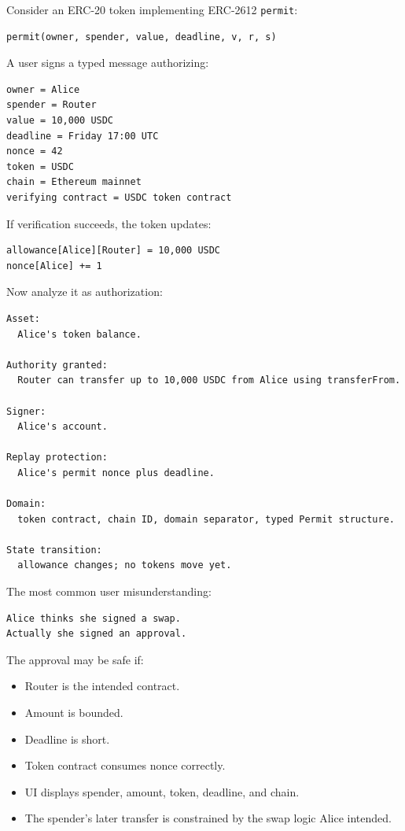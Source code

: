 Consider an ERC-20 token implementing ERC-2612
\passthrough{\lstinline!permit!}:

\begin{lstlisting}
permit(owner, spender, value, deadline, v, r, s)
\end{lstlisting}

A user signs a typed message authorizing:

\begin{lstlisting}
owner = Alice
spender = Router
value = 10,000 USDC
deadline = Friday 17:00 UTC
nonce = 42
token = USDC
chain = Ethereum mainnet
verifying contract = USDC token contract
\end{lstlisting}

If verification succeeds, the token updates:

\begin{lstlisting}
allowance[Alice][Router] = 10,000 USDC
nonce[Alice] += 1
\end{lstlisting}

Now analyze it as authorization:

\begin{lstlisting}
Asset:
  Alice's token balance.

Authority granted:
  Router can transfer up to 10,000 USDC from Alice using transferFrom.

Signer:
  Alice's account.

Replay protection:
  Alice's permit nonce plus deadline.

Domain:
  token contract, chain ID, domain separator, typed Permit structure.

State transition:
  allowance changes; no tokens move yet.
\end{lstlisting}

The most common user misunderstanding:

\begin{lstlisting}
Alice thinks she signed a swap.
Actually she signed an approval.
\end{lstlisting}

The approval may be safe if:

\begin{itemize}
\tightlist
\item
  Router is the intended contract.
\item
  Amount is bounded.
\item
  Deadline is short.
\item
  Token contract consumes nonce correctly.
\item
  UI displays spender, amount, token, deadline, and chain.
\item
  The spender's later transfer is constrained by the swap logic Alice
  intended.
\end{itemize}

